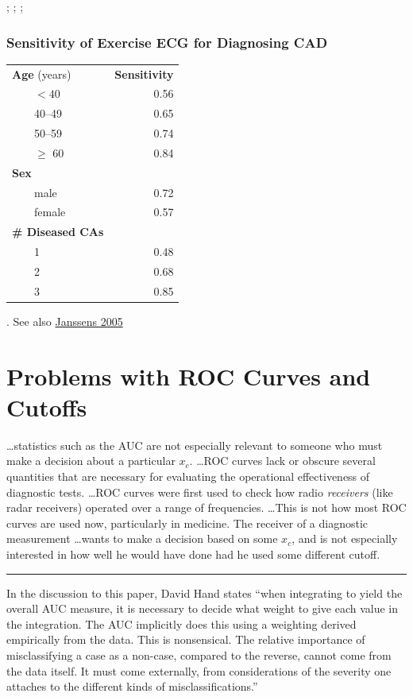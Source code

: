 \citet{hla84fac}; \cite{moo97lim}; \citet{moo03sen}; \citet{gne07str}

\subsubsection{Sensitivity of Exercise ECG for Diagnosing CAD}
\begin{center}\smaller
\begin{tabular}{lr} \hline
\textbf{Age} (years) & \textbf{Sensitivity} \\
~~~~$<40$ & 0.56 \\
~~~~40--49& 0.65 \\
~~~~50--59 & 0.74 \\
~~~~$\geq$ 60 & 0.84 \\ \hline
\textbf{Sex} & \\
~~~~male & 0.72 \\
~~~~female & 0.57 \\ \hline
\textbf{\# Diseased CAs} & \\
~~~~1 & 0.48 \\
~~~~2 & 0.68 \\
~~~~3 & 0.85 \\ \hline
\end{tabular}\end{center}
\citet{hla84fac}.  See also \href{https://journals.sagepub.com/doi/10.1177/0272989X05275154}{Janssens 2005}

\section{Problems with ROC Curves and Cutoffs}
{\smaller \ldots statistics such as the AUC are not especially relevant to someone who
must make a decision about a particular $x_{c}$.  \ldots ROC curves
lack or obscure several quantities that are necessary for evaluating
the operational effectiveness of diagnostic tests. \ldots ROC curves
were first used to check how radio \emph{receivers} (like radar
receivers) operated over a range of frequencies. \ldots This is not
how most ROC curves are used now, particularly in medicine.  The
receiver of a diagnostic measurement \ldots wants to make a decision
based on some $x_{c}$, and is not especially interested in how well he
would have done had he used some different cutoff.~\citet{bri08ski}
\\[1ex]
\hrule
In the discussion to this paper, David Hand
states ``when integrating to yield the overall 
AUC measure, it is necessary to decide what weight to give each value
in the integration.  The AUC implicitly does this using a weighting
derived empirically from the data.  This is nonsensical.  The relative 
importance of misclassifying a case as a non-case, compared to the
reverse, cannot come from the data itself.  It must come externally,
from considerations of the severity one attaches to the different
kinds of misclassifications.''}

